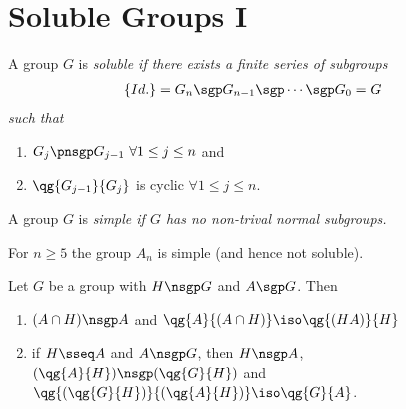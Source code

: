 \documentclass[a4paper]{article}
\begin{document}
\section{Soluble Groups I}

\begin{tdefinition}
  A group \( G \) is \it{soluble} if there exists a finite series of subgroups \begin{align*}
    \left\{ Id. \right\} &= G_n \sgp G_{n-1} \sgp \cdots \sgp G_0 = G
  \end{align*}
  such that \begin{enumerate}
    \item \( G_j \pnsgp G_{j-1} \ \forall 1\le j\le n \) and
    \item \( \qg{G_{j-1}}{G_j} \) is cyclic \( \forall 1\le j\le n  \).
  \end{enumerate}
\end{tdefinition}


\begin{tdefinition}
  A group \( G \) is \it{simple} if \( G \) has no non-trival normal subgroups.
\end{tdefinition}

\begin{tlemma}
  For \( n\geq 5 \) the group \( A_n \) is simple (and hence not soluble).
\end{tlemma}


\begin{tlemma}
  Let \( G \) be a group with \( H\nsgp G \) and \( A\sgp G \).
  Then
  \begin{enumerate}
    \item \( (A\cap H)\nsgp A \) and \( \qg{A}{(A\cap H)}\iso \qg{(HA)}{H} \)
    \item if \( H\sseq A \) and \( A\nsgp G \), then \( H\nsgp A \), \( (\qg{A}{H})\nsgp (\qg{G}{H}) \) and \( \qg{(\qg{G}{H})}{(\qg{A}{H})}\iso \qg{G}{A} \).
  \end{enumerate}
\end{tlemma}
\end{document}
